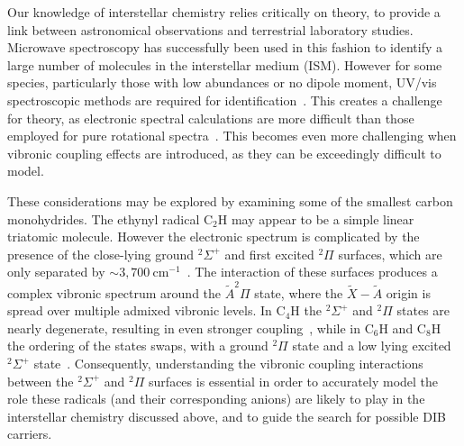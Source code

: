 \documentclass[aip,graphicx]{revtex4-1}
\begin{document}
Our knowledge of interstellar chemistry relies critically on theory, to provide a link between astronomical observations and terrestrial laboratory studies. Microwave spectroscopy has successfully been used in this fashion to identify a large number of molecules in the interstellar medium (ISM). However for some species, particularly those with low abundances or no dipole moment, UV/vis spectroscopic methods are required for identification~\cite{mai97}. This creates a challenge for theory, as electronic spectral calculations are more difficult than those employed for pure rotational spectra~\cite{for10}. This becomes even more challenging when vibronic coupling effects are introduced, as they can be exceedingly difficult to model.

These considerations may be explored by examining some of the smallest carbon monohydrides. The ethynyl radical C$_2$H may appear to be a simple linear triatomic molecule. However the electronic spectrum is complicated by the presence of the close-lying ground $^2\Sigma^+$ and first excited $^2\Pi$ surfaces, which are only separated by $\sim3,700~$cm$^{-1}$~\cite{cur85,tar03}. The interaction of these surfaces produces a complex vibronic spectrum around the $\tilde{A}^2\Pi$ state, where the $\tilde{X}-\tilde{A}$ origin is spread over multiple admixed vibronic levels. In C$_4$H the $^2\Sigma^+$ and $^2\Pi$ states are nearly degenerate, resulting in even stronger coupling~\cite{zho07b}, while in C$_6$H and C$_8$H the ordering of the states swaps, with a ground $^2\Pi$ state and a low lying excited $^2\Sigma^+$ state~\cite{lin99,tay98}. Consequently, understanding the vibronic coupling interactions between the $^2\Sigma^+$ and $^2\Pi$ surfaces is essential in order to accurately model the role these radicals (and their corresponding anions) are likely to play in the interstellar chemistry discussed above, and to guide the search for possible DIB carriers.
\end{document}
